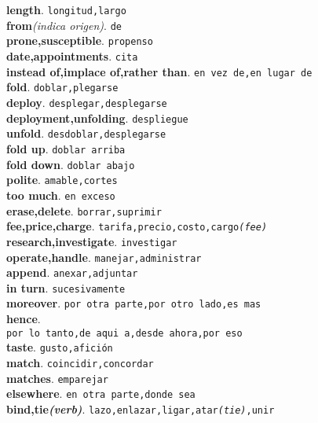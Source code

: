 \documentclass[twocolumn]{article}
\begin{document}
	\textsf{\textbf{length}}. \texttt{longitud,largo}\\
	\textsf{\textbf{from}}{\scriptsize \textsl{(indica origen)}}. \texttt{de}\\
	\textsf{\textbf{prone,susceptible}}. \texttt{propenso}\\
	\textsf{\textbf{date,appointments}}. \texttt{cita}\\
	\textsf{\textbf{instead of,implace of,rather than}}. \texttt{en vez de,en lugar de}\\
	\textsf{\textbf{fold}}. \texttt{doblar,plegarse}\\
	\textsf{\textbf{deploy}}. \texttt{desplegar,desplegarse}\\
	\textsf{\textbf{deployment,unfolding}}. \texttt{despliegue}\\
	\textsf{\textbf{unfold}}. \texttt{desdoblar,desplegarse}\\
	\textsf{\textbf{fold up}}. \texttt{doblar arriba}\\
	\textsf{\textbf{fold down}}. \texttt{doblar abajo}\\
	\textsf{\textbf{polite}}. \texttt{amable,cortes}\\
	\textsf{\textbf{too much}}. \texttt{en exceso}\\
	\textsf{\textbf{erase,delete}}. \texttt{borrar,suprimir}\\
	\textsf{\textbf{fee,price,charge}}. \texttt{tarifa,precio,costo,cargo{\scriptsize \textsl{(fee)}}}\\
	\textsf{\textbf{research,investigate}}. \texttt{investigar}\\
	\textsf{\textbf{operate,handle}}. \texttt{manejar,administrar}\\
	\textsf{\textbf{append}}. \texttt{anexar,adjuntar}\\
	\textsf{\textbf{in turn}}. \texttt{sucesivamente}\\
	\textsf{\textbf{moreover}}. \texttt{por otra parte,por otro lado,es mas}\\
	\textsf{\textbf{hence}}.\\\texttt{por lo tanto,de aqui a,desde ahora,por eso}\\
	\textsf{\textbf{taste}}. \texttt{gusto,afici\'on}\\
	\textsf{\textbf{match}}. \texttt{coincidir,concordar}\\
	\textsf{\textbf{matches}}. \texttt{emparejar}\\
	\textsf{\textbf{elsewhere}}. \texttt{en otra parte,donde sea}\\
	\textsf{\textbf{bind,tie{\scriptsize \textsl{(verb)}}}}. \texttt{lazo,enlazar,ligar,atar{\scriptsize \textsl{(tie)}},unir}\\
\end{document}
